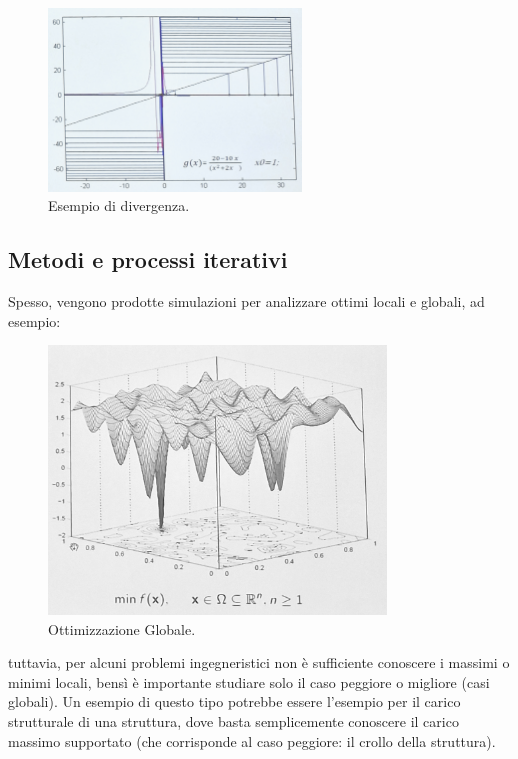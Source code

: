 \newpage
\begin{figure}[h!]
    \centering 
    \includegraphics[width=0.6\textwidth]{Esterni/Altro/imgs/20250226_095648.jpg} 
    \caption{Esempio di divergenza.} 
    \label{fig:fib3} 
\end{figure}

\subsection{Metodi e processi iterativi}
Spesso, vengono prodotte simulazioni per analizzare ottimi locali e globali, ad esempio:
\begin{figure}[h!]
    \centering 
    \includegraphics[width=0.8\textwidth]{Esterni/Altro/imgs/20250226_103050.jpg} 
    \caption{Ottimizzazione Globale.} 
    \label{fig:glob_ott} 
\end{figure}
tuttavia, per alcuni problemi ingegneristici non è sufficiente conoscere i massimi o minimi locali, bensì è importante studiare solo il caso peggiore o migliore (casi globali).
Un esempio di questo tipo potrebbe essere l'esempio per il carico strutturale di una struttura, dove basta semplicemente conoscere il carico massimo supportato (che corrisponde al caso peggiore: il crollo della struttura).

